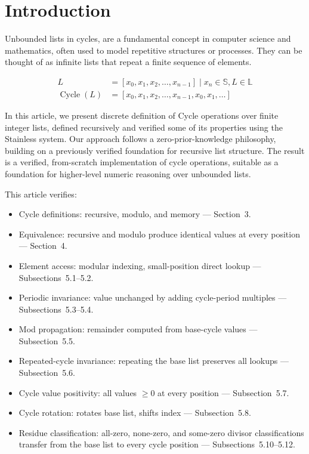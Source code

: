 \section{Introduction}

Unbounded lists in cycles, are a fundamental concept in computer science and
mathematics, often used to model repetitive structures or processes. They can
be thought of as infinite lists that repeat a finite sequence of elements.

\begin{equation*}
\begin{aligned}
L &= [x_0, x_1, x_2, \ldots, x_{n-1}]
  \mid x_n \in \mathbb{S}, L \in \mathbb{L} \\
\operatorname{Cycle}(L)
  &= [x_0, x_1, x_2, \ldots, x_{n-1}, x_0, x_1, \ldots]
\end{aligned}
\end{equation*}

In this article, we present discrete definition of Cycle operations over finite
integer lists, defined recursively and verified some of its properties using
the Stainless system. Our approach follows a zero-prior-knowledge philosophy,
building on a previously verified foundation for recursive list structure. The
result is a verified, from-scratch implementation of cycle operations, suitable
as a foundation for higher-level numeric reasoning over unbounded lists.

This article verifies:

\begin{itemize}
  \item Cycle definitions: recursive, modulo, and memory --- Section~3.
  \item Equivalence: recursive and modulo produce identical values at every
    position --- Section~4.
  \item Element access: modular indexing, small-position direct lookup ---
    Subsections~5.1--5.2.
  \item Periodic invariance: value unchanged by adding cycle-period multiples
    --- Subsections~5.3--5.4.
  \item Mod propagation: remainder computed from base-cycle values ---
    Subsection~5.5.
  \item Repeated-cycle invariance: repeating the base list preserves all
    lookups --- Subsection~5.6.
  \item Cycle value positivity: all values $\geq 0$ at every position ---
    Subsection~5.7.
  \item Cycle rotation: rotates base list, shifts index --- Subsection~5.8.
  \item Residue classification: all-zero, none-zero, and some-zero divisor
    classifications transfer from the base list to every cycle position ---
    Subsections~5.10--5.12.
\end{itemize}

